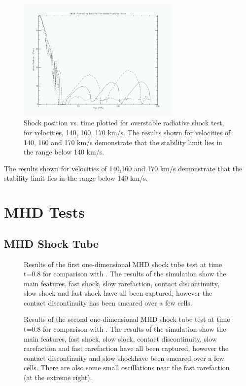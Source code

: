 \begin{figure}[t]
\centering
\includegraphics[width=8cm]{osrshock}
\caption{
Shock position vs. time plotted for overstable radiative shock test, for velocities, 140, 160, 170 km/s.
The results shown for velocities of 140, 160 and 170 km/s demonstrate that the stability limit lies in the range below 140 km/s.
}
\label{fig:3-6} %
\end{figure}


The results shown for velocities of 140,160 and 170 km/s demonstrate that the stability limit lies in the range below 140 km/s.

\section{MHD Tests}
\subsection{MHD Shock Tube}



\begin{figure}[tb]
  \centering
  
  \caption{Results of the first one-dimensional MHD shock tube \citet{1995ApJ...442..228R} test at time t=0.8 for comparison with \citet{1995ApJ...442..228R}.  The results of the simulation show the main features, fast shock, slow rarefaction, contact discontinuity, slow shock and fast shock have all been captured, however the contact discontinuity has been smeared over a few cells.
}
  \label{fig:rj1a}
\end{figure}

\begin{figure}[tb]
  \centering
  
  \caption{Results of the second one-dimensional MHD shock tube \citet{1995ApJ...442..228R} test at time t=0.8 for comparison with \citet{1995ApJ...442..228R}.  The results of the simulation show the main features, fast shock, slow slock, contact discontinuity, slow rarefaction and fast rarefaction have all been captured, however the contact discontinuity and slow shockhave been smeared over a few cells. There are also some small oscillations near the fast rarefaction (at the extreme right).
}
  \label{fig:rj1b}
\end{figure}

